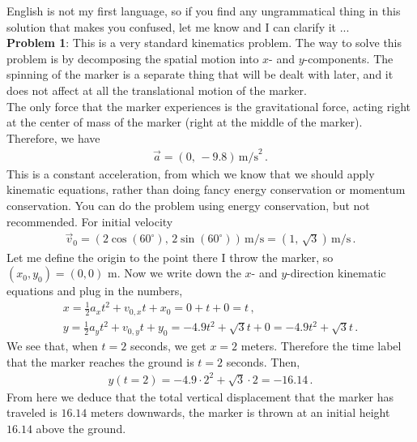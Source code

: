 \documentclass[11pt]{article}
\begin{document}
\newpage
English is not my first language, so if you find any ungrammatical thing in this solution that makes you confused, let me know and I can clarify it ...\\

\noindent\textbf{Problem 1}: This is a very standard kinematics problem. The way to solve this problem is by decomposing the spatial motion into $x$- and $y$-components. The spinning of the marker is a separate thing that will be dealt with later, and it does not affect at all the translational motion of the marker. \\

The only force that the marker experiences is the gravitational force, acting right at the center of mass of the marker (right at the middle of the marker). Therefore, we have 
\begin{align*}
\vec{a} = (0,\, -9.8)\,\text{m/s}^2\,.
\end{align*}
This is a constant acceleration, from which we know that we should apply kinematic equations, rather than doing fancy energy conservation or momentum conservation. You can do the problem using energy conservation, but not recommended. For initial velocity 
\begin{align*}
\vec{v}_0 = (2\cos(60^\circ),\, 2\sin(60^\circ))\,\text{m/s} =(1,\, \sqrt{3})\,\text{m/s} \,. 
\end{align*}
Let me define the origin to the point there I throw the marker, so $(x_0,y_0 )= (0,0)$ m. Now we write down the $x$- and $y$-direction kinematic equations and plug in the numbers, 
\begin{align*}
x = \frac{1}{2}a_x t^2 + v_{0,x}t  + x_0 =0 + t + 0 =t\,,\\
y = \frac{1}{2}a_y t^2 + v_{0,y}t  + y_0 = -4.9t^2 + \sqrt{3}t+ 0  = -4.9 t^2 + \sqrt{3} t\,.
\end{align*}
We see that, when $t = 2$ seconds, we get $x = 2$ meters. Therefore the time label that the marker reaches the ground is $t = 2$ seconds. Then, 
\begin{align*}
y(t=2) = -4.9 \cdot 2^2 + \sqrt{3} \cdot 2 = - 16.14\,.
\end{align*}
From here we deduce that the total vertical displacement that the marker has traveled is $16.14$ meters downwards, the marker is thrown at an initial height $16.14$ above the ground. \\
\end{document}
